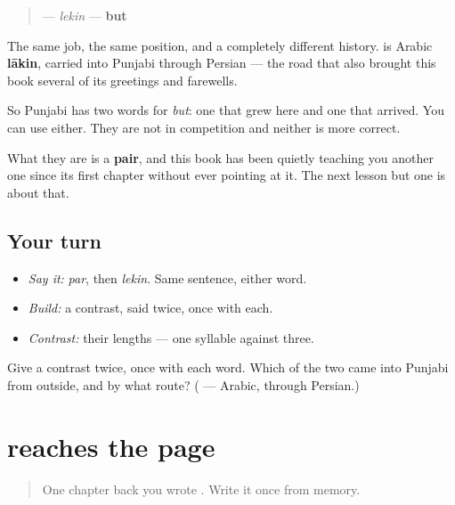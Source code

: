 \begin{cousinweb}
\begin{quote}
\textbf{} — \emph{lekin} — \textbf{but}
\end{quote}

The same job, the same position, and a completely different history. \textbf{} is Arabic \textbf{lākin}, carried into Punjabi through Persian — the road that also brought this book several of its greetings and farewells.

So Punjabi has two words for \emph{but}: one that grew here and one that arrived. You can use either. They are not in competition and neither is more correct.

What they are is a \textbf{pair}, and this book has been quietly teaching you another one since its first chapter without ever pointing at it. The next lesson but one is about that.
\end{cousinweb}

\subsection*{Your turn}
\begin{itemize}
\raggedright
  \item \emph{Say it:} \emph{par}, then \emph{lekin}. Same sentence, either word.
  \item \emph{Build:} a contrast, said twice, once with each.
  \item \emph{Contrast:} their lengths — one syllable against three.
\end{itemize}

\begin{tcolorbox}[breakable,colback=teal!4,colframe=teal!35!black,title={Before you move on}]
Give a contrast twice, once with each word. Which of the two came into Punjabi from outside, and by what route? (\textbf{} — Arabic, through Persian.)
\end{tcolorbox}
\section[\texorpdfstring{\pa{ਪਰ} (par)}{ਪਰ (par)}]{ reaches the page}

\label{lesson:PA-C39-par-write}



\begin{quote}
One chapter back you wrote \textbf{}. Write it once from memory.
\end{quote}

